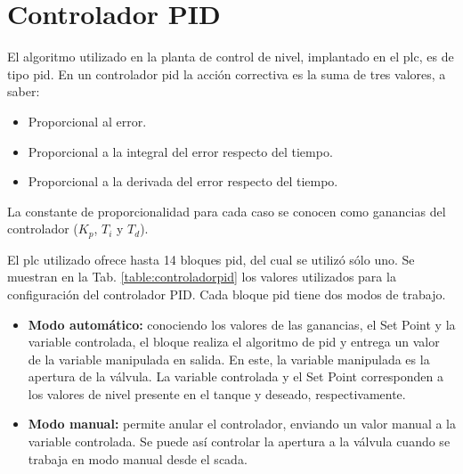 \section{Controlador PID}
\label{sec:controladorpid}

El algoritmo utilizado en la planta de control de nivel, implantado en el
\gls{plc}, es de tipo \gls{pid}.
En un controlador \gls{pid} la acción correctiva es la suma de tres valores, a
saber:

\begin{itemize}
 \item Proporcional al error.
 \item Proporcional a la integral del error respecto del tiempo.
 \item Proporcional a la derivada del error respecto del tiempo.
\end{itemize}
La constante de proporcionalidad para cada caso se conocen como ganancias del
controlador ($K_p$, $T_i$ y $T_d$).

El \gls{plc} utilizado ofrece hasta 14 bloques \gls{pid}, del cual se utilizó
sólo uno.
Se muestran en la Tab. \ref{table:controladorpid} los valores utilizados para
la configuración del controlador PID.
Cada bloque \gls{pid} tiene dos modos de trabajo.
\begin{itemize}
 \item \textbf{Modo automático:} conociendo los valores de las ganancias, el
Set Point y la variable controlada, el bloque realiza el algoritmo de \gls{pid} y entrega
un valor de la variable manipulada en salida.
En este, la variable manipulada es la apertura de la válvula.
La variable controlada y el Set Point corresponden a los valores de nivel
presente en el tanque y deseado, respectivamente.
 \item \textbf{Modo manual:} permite anular el controlador, enviando un valor
manual a la variable controlada.
Se puede así controlar la apertura a la válvula cuando se
trabaja en modo manual desde el \gls{scada}.

\end{itemize}

